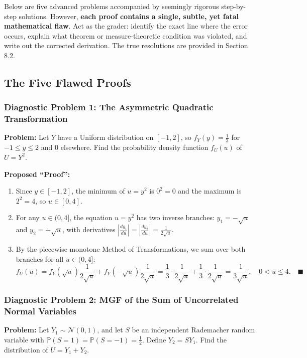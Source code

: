 \documentclass[11pt, letterpaper]{article}
\theoremstyle{definition}
\theoremstyle{remark}
\newcommand{\Prob}{\mathbb{P}}
\begin{document}
\begin{itemize}
Below are five advanced problems accompanied by seemingly rigorous step-by-step solutions. However, \textbf{each proof contains a single, subtle, yet fatal mathematical flaw}. Act as the grader: identify the exact line where the error occurs, explain what theorem or measure-theoretic condition was violated, and write out the corrected derivation. The true resolutions are provided in Section 8.2.

\subsection{The Five Flawed Proofs}

\subsubsection*{Diagnostic Problem 1: The Asymmetric Quadratic Transformation}
\textbf{Problem:} Let $Y$ have a Uniform distribution on $[-1, 2]$, so $f_Y(y) = \frac{1}{3}$ for $-1 \le y \le 2$ and $0$ elsewhere. Find the probability density function $f_U(u)$ of $U = Y^2$.

\textbf{Proposed ``Proof'':}
\begin{enumerate}[label=\textbf{Line \arabic*:}]
    \item Since $y \in [-1, 2]$, the minimum of $u = y^2$ is $0^2 = 0$ and the maximum is $2^2 = 4$, so $u \in [0, 4]$.
    \item For any $u \in (0, 4]$, the equation $u = y^2$ has two inverse branches: $y_1 = -\sqrt{u}$ and $y_2 = +\sqrt{u}$, with derivatives $\left|\frac{dy_1}{du}\right| = \left|\frac{dy_2}{du}\right| = \frac{1}{2\sqrt{u}}$.
    \item By the piecewise monotone Method of Transformations, we sum over both branches for all $u \in (0, 4]$:
    \[
        f_U(u) = f_Y(\sqrt{u})\frac{1}{2\sqrt{u}} + f_Y(-\sqrt{u})\frac{1}{2\sqrt{u}} = \frac{1}{3}\cdot\frac{1}{2\sqrt{u}} + \frac{1}{3}\cdot\frac{1}{2\sqrt{u}} = \frac{1}{3\sqrt{u}}, \quad 0 < u \le 4. \quad \blacksquare
    \]
\end{enumerate}

\subsubsection*{Diagnostic Problem 2: MGF of the Sum of Uncorrelated Normal Variables}
\textbf{Problem:} Let $Y_1 \sim \mathcal{N}(0, 1)$, and let $S$ be an independent Rademacher random variable with $\Prob(S = 1) = \Prob(S = -1) = \frac{1}{2}$. Define $Y_2 = S Y_1$. Find the distribution of $U = Y_1 + Y_2$.


\end{itemize}
\end{document}
